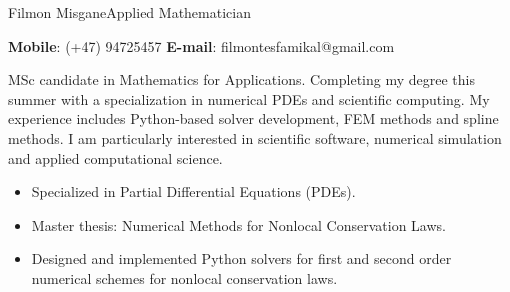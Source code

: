 \documentclass{article}
\begin{document}
\begin{cv}{Filmon Misgane}{Applied Mathematician}%

    \textbf{Mobile}: (+47) 94725457 \quad \textbf{E-mail}: filmontesfamikal@gmail.com

    MSc candidate in Mathematics for Applications. Completing my degree this summer with a specialization in numerical PDEs and scientific computing. My experience includes Python-based solver development, FEM methods and spline methods. I am particularly interested in scientific software, numerical simulation and applied computational science.

    \begin{cvevent}[08.2024][Present] 
        \begin{itemize}
            \item Specialized in Partial Differential Equations (PDEs).
            \item Master thesis: Numerical Methods for Nonlocal Conservation Laws.
            \item Designed and implemented Python solvers for first and second order numerical schemes for nonlocal conservation laws.
        \end{itemize}
        \hrulefill
    \end{cvevent}

    \begin{cvevent}[08.2021][06.2024] 
        \hrulefill
    \end{cvevent}


\end{cv}
\end{document}
